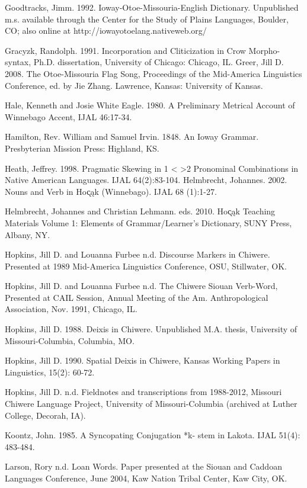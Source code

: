 \documentclass[output=paper]{LSP/langsci}
\begin{document}
\begin{reflist}
Goodtracks, Jimm. 1992. Ioway-Otoe-Missouria-English Dictionary.  Unpublished m.s. available through the Center for the Study of Plains Languages, Boulder, CO;  also online at http://iowayotoelang.nativeweb.org/

Gracyzk, Randolph. 1991. Incorporation and Cliticization in Crow Morpho-syntax, Ph.D. dissertation,	University of Chicago:  Chicago, IL.   							    
Greer, Jill D.  2008.  The Otoe-Missouria Flag Song, Proceedings of the Mid-America Linguistics Conference, ed. by Jie Zhang.  Lawrence, Kansas:  University of Kansas. 		     

Hale, Kenneth and Josie White Eagle. 1980.  A Preliminary Metrical Account of Winnebago Accent, IJAL 46:17-34.   

Hamilton, Rev. William and Samuel Irvin. 1848.  An Ioway Grammar.  Presbyterian Mission Press:  Highland, KS.    	
									   
Heath, Jeffrey. 1998. Pragmatic Skewing in 1 < >2 Pronominal Combinations in Native American Languages. IJAL 64(2):83-104.    					      		      
Helmbrecht, Johannes.  2002.  Nouns and Verb in Ho\k{c}\k{a}k (Winnebago). IJAL 68 (1):1-27.  		                        

Helmbrecht, Johannes and Christian Lehmann. eds. 2010.  Ho\k{c}\k{a}k Teaching Materials Volume 1: Elements of Grammar/Learner's Dictionary,  SUNY Press, Albany, NY.

Hopkins, Jill D. and Louanna Furbee n.d. Discourse Markers in Chiwere. Presented at 1989 Mid-America Linguistics Conference, OSU, Stillwater, OK.  	   

Hopkins, Jill D. and Louanna Furbee  n.d. The Chiwere Siouan Verb-Word, Presented at CAIL  Session, Annual Meeting of the Am. Anthropological Association, Nov. 1991,  Chicago, IL.   

Hopkins, Jill D. 1988. Deixis in Chiwere. Unpublished M.A. thesis, University of Missouri-Columbia, Columbia, MO.								  	   

Hopkins, Jill D. 1990. Spatial Deixis in Chiwere, Kansas Working Papers in Linguistics, 15(2): 60-72. 
 
Hopkins, Jill D. n.d.  Fieldnotes and transcriptions from 1988-2012, Missouri Chiwere Language Project, University of Missouri-Columbia (archived at Luther College, Decorah, IA).  		
 
Koontz, John. 1985. A Syncopating Conjugation *k- stem in Lakota.  IJAL 51(4): 483-484.           
  
Larson, Rory n.d.  Loan Words. Paper presented at the Siouan and Caddoan Languages Conference, June 2004, Kaw Nation Tribal Center, Kaw City, OK.  	
  			  	   

\end{reflist}
\end{document}
